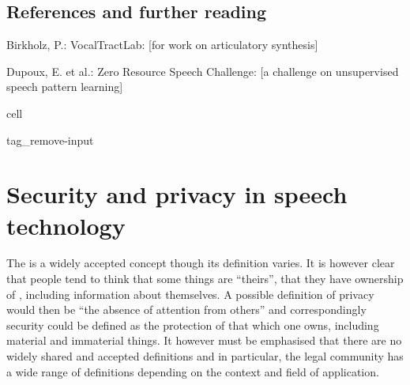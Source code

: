 \documentclass[letterpaper,10pt,english]{jupyterBook}
\begin{document}
\section{References and further reading}
\label{\detokenize{Computational_models_of_human_language_processing:references-and-further-reading}}
\sphinxAtStartPar


\sphinxAtStartPar
Birkholz, P.: VocalTractLab:  {[}for work
on articulatory synthesis{]}

\sphinxAtStartPar
Dupoux, E. et al.: Zero Resource Speech Challenge:
 {[}a challenge on unsupervised speech
pattern learning{]}

\sphinxstepscope

\begin{sphinxuseclass}{cell}
\begin{sphinxuseclass}{tag_remove-input}
\end{sphinxuseclass}
\end{sphinxuseclass}

\chapter{Security and privacy in speech technology}
\label{\detokenize{Security_and_privacy:security-and-privacy-in-speech-technology}}\label{\detokenize{Security_and_privacy::doc}}
\sphinxAtStartPar
{} 

\sphinxAtStartPar
The 
is a widely accepted concept though its definition varies. It is however
clear that people tend to think that some things are “theirs”, that they
have ownership of , including information about themselves. A
possible definition of privacy would then be “the absence of attention
from others” and correspondingly security could be defined as the
protection of that which one owns, including material and immaterial
things. It however must be emphasised that there are no widely shared
and accepted definitions and in particular, the legal community has a
wide range of definitions depending on the context and field of
application.
\end{document}

